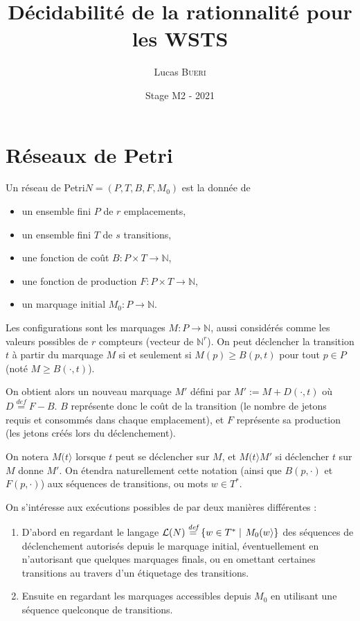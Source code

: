\documentclass[a4paper,final]{article}
\title{Décidabilité de la rationnalité pour les WSTS}
\author{Lucas \textsc{Bueri}}
\date{Stage M2 - 2021}
\let\geq\geqslant
\newcommand{\set}[2]{\left\{#1\mathrel{\left|\vphantom{#1}\vphantom{#2}\right.}#2\right\}}
\newcommand{\defeq}{\ensuremath{\stackrel{\textit{def}}{=}}}
\newcommand{\N}{\ensuremath{\mathbb{N}}}
\newcommand{\petri}{réseau de Petri\xspace}
\newcommand{\fire}[2]{\ensuremath{#1 (#2\rangle}}
\newcommand{\lang}{\ensuremath{\mathcal{L}}}
\begin{document}
\maketitle


\section{Réseaux de Petri}

Un \petri $N = (P,T,B,F,M_0)$ est la donnée de
\begin{itemize}
    \item un ensemble fini $P$ de $r$ emplacements,
    \item un ensemble fini $T$ de $s$ transitions,
    \item une fonction de coût $B: P\times T\to\N$,
    \item une fonction de production $F: P\times T\to\N$,
    \item un marquage initial $M_0: P\to\N$.
\end{itemize}

Les configurations sont les marquages $M: P\to\N$, aussi considérés comme les valeurs possibles de $r$ compteurs (vecteur de $\N^r$).
On peut déclencher la transition $t$ à partir du marquage $M$ si et seulement si $M(p)\geq B(p,t)$ pour tout $p\in P$ (noté $M\geq B(\cdot,t)$).

On obtient alors un nouveau marquage $M'$ défini par $M':=M+D(\cdot,t)$ où $D\defeq F-B$. 
$B$ représente donc le coût de la transition (le nombre de jetons requis et consommés dans chaque emplacement), et $F$ représente sa production (les jetons créés lors du déclenchement).

On notera $\fire{M}{t}$ lorsque $t$ peut se déclencher sur $M$, et $\fire{M}{t}M'$ si déclencher $t$ sur $M$ donne $M'$.
On étendra naturellement cette notation (ainsi que $B(p,\cdot)$ et $F(p,\cdot)$) aux séquences de transitions, ou mots $w\in T^\ast$.

On s'intéresse aux exécutions possibles de par deux manières différentes :
\begin{enumerate}
    \item D'abord en regardant le langage $\lang(N)\defeq \set{w\in T^\ast} {\fire{M_0}{w}}$ des séquences de déclenchement autorisés depuis le marquage initial, éventuellement en n'autorisant que quelques marquages finals, ou en omettant certaines transitions au travers d'un étiquetage des transitions.
    \item Ensuite en regardant les marquages accessibles depuis $M_0$ en utilisant une séquence quelconque de transitions.
\end{enumerate}
\end{document}
